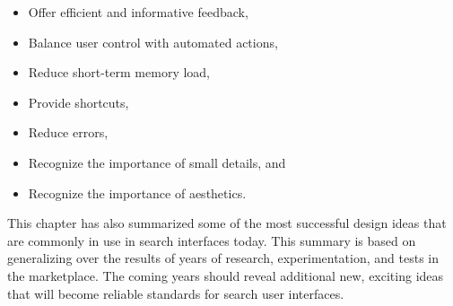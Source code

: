 \documentclass[sigconf,nonacm,screen,pbalance]{acmart}
\begin{document}
\begin{itemize}
\item Offer efficient and informative feedback, 
\item Balance user control with automated actions, 
\item Reduce short-term memory load, 
\item Provide shortcuts, 
\item Reduce errors, 
\item Recognize the importance of small details, and 
\item Recognize the importance of aesthetics. 
\end{itemize}

This chapter has also summarized some of the most successful design ideas that are commonly in use in
search interfaces today. This summary is based on generalizing over the results of years of research,
experimentation, and tests in the marketplace. The coming years should reveal additional new, exciting
ideas that will become reliable standards for search user interfaces.
\end{document}
